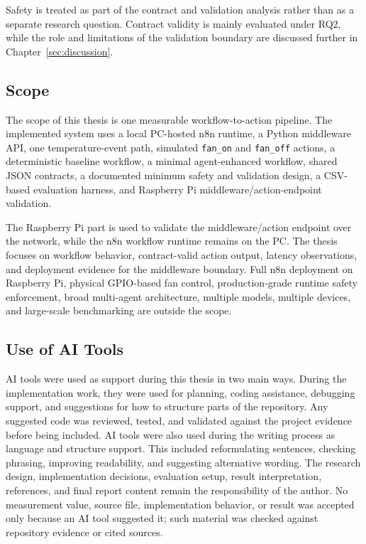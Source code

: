 Safety is treated as part of the contract and validation analysis rather than as a separate research question. Contract validity is mainly evaluated under RQ2, while the role and limitations of the validation boundary are discussed further in Chapter~\ref{sec:discussion}.

\subsection{Scope}\label{subsec:scope-limitations}

The scope of this thesis is one measurable workflow-to-action pipeline. The implemented system uses a local PC-hosted n8n runtime, a Python middleware API, one temperature-event path, simulated \texttt{fan\_on} and \texttt{fan\_off} actions, a deterministic baseline workflow, a minimal agent-enhanced workflow, shared JSON contracts, a documented minimum safety and validation design, a CSV-based evaluation harness, and Raspberry Pi middleware/action-endpoint validation.

The Raspberry Pi part is used to validate the middleware/action endpoint over the network, while the n8n workflow runtime remains on the PC. The thesis focuses on workflow behavior, contract-valid action output, latency observations, and deployment evidence for the middleware boundary. Full n8n deployment on Raspberry Pi, physical GPIO-based fan control, production-grade runtime safety enforcement, broad multi-agent architecture, multiple models, multiple devices, and large-scale benchmarking are outside the scope.







\subsection{Use of AI Tools}\label{subsec:ai-tools}

AI tools were used as support during this thesis in two main ways. During the implementation work, they were used for planning, coding assistance, debugging support, and suggestions for how to structure parts of the repository. Any suggested code was reviewed, tested, and validated against the project evidence before being included.
AI tools were also used during the writing process as language and structure support. This included reformulating sentences, checking phrasing, improving readability, and suggesting alternative wording. The research design, implementation decisions, evaluation setup, result interpretation, references, and final report content remain the responsibility of the author. No measurement value, source file, implementation behavior, or result was accepted only because an AI tool suggested it; such material was checked against repository evidence or cited sources.


